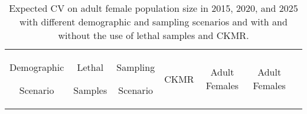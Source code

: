 \begin{table}
%
\caption{Expected CV on adult female population size in 2015, 2020, and 2025
with different demographic and sampling scenarios and with and without
the use of lethal samples and CKMR. \label{tab:N_Expected-CV}}

\begin{tabular}{|c|c|c|c|c|c|c|}
\hline 
\begin{cellvarwidth}[t]
\centering
Demographic 

Scenario
\end{cellvarwidth} & \begin{cellvarwidth}[t]
\centering
Lethal 

Samples
\end{cellvarwidth} & \begin{cellvarwidth}[t]
\centering
Sampling 

Scenario
\end{cellvarwidth} & CKMR & \begin{cellvarwidth}[t]
\centering
2015 

Adult Females
\end{cellvarwidth} & \begin{cellvarwidth}[t]
\centering
2020 

Adult Females
\end{cellvarwidth} & \begin{cellvarwidth}[t]
\centering
2025 


\end{cellvarwidth}
\end{tabular}
\end{table}
